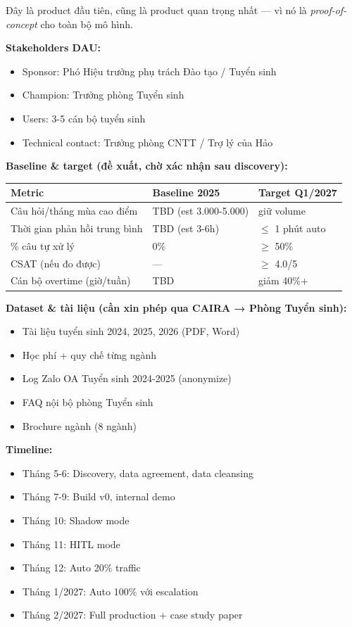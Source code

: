 \documentclass[11pt,a4paper]{article}
\begin{document}
Đây là product đầu tiên, cũng là product quan trọng nhất --- vì nó là
\textit{proof-of-concept} cho toàn bộ mô hình.

\textbf{Stakeholders DAU:}
\begin{itemize}
\item Sponsor: Phó Hiệu trưởng phụ trách Đào tạo / Tuyển sinh
\item Champion: Trưởng phòng Tuyển sinh
\item Users: 3-5 cán bộ tuyển sinh
\item Technical contact: Trưởng phòng CNTT / Trợ lý của Hảo
\end{itemize}

\textbf{Baseline \& target (đề xuất, chờ xác nhận sau discovery):}

\begin{tabularx}{\linewidth}{@{}p{4cm} X X@{}}
\toprule
\textbf{Metric} & \textbf{Baseline 2025} & \textbf{Target Q1/2027} \\
\midrule
Câu hỏi/tháng mùa cao điểm & TBD (est 3.000-5.000) & giữ volume \\
Thời gian phản hồi trung bình & TBD (est 3-6h) & $\leq$ 1 phút auto \\
\% câu tự xử lý & 0\% & $\geq$ 50\% \\
CSAT (nếu đo được) & --- & $\geq$ 4.0/5 \\
Cán bộ overtime (giờ/tuần) & TBD & giảm 40\%+ \\
\bottomrule
\end{tabularx}

\textbf{Dataset \& tài liệu (cần xin phép qua CAIRA → Phòng Tuyển sinh):}
\begin{itemize}
\item Tài liệu tuyển sinh 2024, 2025, 2026 (PDF, Word)
\item Học phí + quy chế từng ngành
\item Log Zalo OA Tuyển sinh 2024-2025 (anonymize)
\item FAQ nội bộ phòng Tuyển sinh
\item Brochure ngành (8 ngành)
\end{itemize}

\textbf{Timeline:}
\begin{itemize}
\item Tháng 5-6: Discovery, data agreement, data cleansing
\item Tháng 7-9: Build v0, internal demo
\item Tháng 10: Shadow mode
\item Tháng 11: HITL mode
\item Tháng 12: Auto 20\% traffic
\item Tháng 1/2027: Auto 100\% với escalation
\item Tháng 2/2027: Full production + case study paper
\end{itemize}
\end{document}
